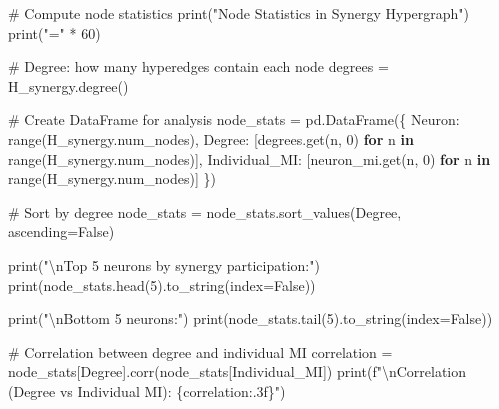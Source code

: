 \documentclass[
  11pt,
  letterpaper,
  oneside,
  openany]{book}
\newenvironment{Shaded}{\begin{snugshade}}{\end{snugshade}}
\newcommand{\BuiltInTok}[1]{\textcolor[rgb]{0.00,0.23,0.31}{#1}}
\newcommand{\CharTok}[1]{\textcolor[rgb]{0.13,0.47,0.30}{#1}}
\newcommand{\CommentTok}[1]{\textcolor[rgb]{0.37,0.37,0.37}{#1}}
\newcommand{\ControlFlowTok}[1]{\textcolor[rgb]{0.00,0.23,0.31}{\textbf{#1}}}
\newcommand{\DecValTok}[1]{\textcolor[rgb]{0.68,0.00,0.00}{#1}}
\newcommand{\KeywordTok}[1]{\textcolor[rgb]{0.00,0.23,0.31}{\textbf{#1}}}
\newcommand{\NormalTok}[1]{\textcolor[rgb]{0.00,0.23,0.31}{#1}}
\newcommand{\OperatorTok}[1]{\textcolor[rgb]{0.37,0.37,0.37}{#1}}
\newcommand{\SpecialCharTok}[1]{\textcolor[rgb]{0.37,0.37,0.37}{#1}}
\newcommand{\SpecialStringTok}[1]{\textcolor[rgb]{0.13,0.47,0.30}{#1}}
\newcommand{\StringTok}[1]{\textcolor[rgb]{0.13,0.47,0.30}{#1}}
\newcommand{\VariableTok}[1]{\textcolor[rgb]{0.07,0.07,0.07}{#1}}
\begin{document}
\begin{Shaded}
\begin{Highlighting}[]
\CommentTok{\# Compute node statistics}
\BuiltInTok{print}\NormalTok{(}\StringTok{"Node Statistics in Synergy Hypergraph"}\NormalTok{)}
\BuiltInTok{print}\NormalTok{(}\StringTok{"="} \OperatorTok{*} \DecValTok{60}\NormalTok{)}

\CommentTok{\# Degree: how many hyperedges contain each node}
\NormalTok{degrees }\OperatorTok{=}\NormalTok{ H\_synergy.degree()}

\CommentTok{\# Create DataFrame for analysis}
\NormalTok{node\_stats }\OperatorTok{=}\NormalTok{ pd.DataFrame(\{}
    \StringTok{\textquotesingle{}Neuron\textquotesingle{}}\NormalTok{: }\BuiltInTok{range}\NormalTok{(H\_synergy.num\_nodes),}
    \StringTok{\textquotesingle{}Degree\textquotesingle{}}\NormalTok{: [degrees.get(n, }\DecValTok{0}\NormalTok{) }\ControlFlowTok{for}\NormalTok{ n }\KeywordTok{in} \BuiltInTok{range}\NormalTok{(H\_synergy.num\_nodes)],}
    \StringTok{\textquotesingle{}Individual\_MI\textquotesingle{}}\NormalTok{: [neuron\_mi.get(n, }\DecValTok{0}\NormalTok{) }\ControlFlowTok{for}\NormalTok{ n }\KeywordTok{in} \BuiltInTok{range}\NormalTok{(H\_synergy.num\_nodes)]}
\NormalTok{\})}

\CommentTok{\# Sort by degree}
\NormalTok{node\_stats }\OperatorTok{=}\NormalTok{ node\_stats.sort\_values(}\StringTok{\textquotesingle{}Degree\textquotesingle{}}\NormalTok{, ascending}\OperatorTok{=}\VariableTok{False}\NormalTok{)}

\BuiltInTok{print}\NormalTok{(}\StringTok{"}\CharTok{\textbackslash{}n}\StringTok{Top 5 neurons by synergy participation:"}\NormalTok{)}
\BuiltInTok{print}\NormalTok{(node\_stats.head(}\DecValTok{5}\NormalTok{).to\_string(index}\OperatorTok{=}\VariableTok{False}\NormalTok{))}

\BuiltInTok{print}\NormalTok{(}\StringTok{"}\CharTok{\textbackslash{}n}\StringTok{Bottom 5 neurons:"}\NormalTok{)}
\BuiltInTok{print}\NormalTok{(node\_stats.tail(}\DecValTok{5}\NormalTok{).to\_string(index}\OperatorTok{=}\VariableTok{False}\NormalTok{))}

\CommentTok{\# Correlation between degree and individual MI}
\NormalTok{correlation }\OperatorTok{=}\NormalTok{ node\_stats[}\StringTok{\textquotesingle{}Degree\textquotesingle{}}\NormalTok{].corr(node\_stats[}\StringTok{\textquotesingle{}Individual\_MI\textquotesingle{}}\NormalTok{])}
\BuiltInTok{print}\NormalTok{(}\SpecialStringTok{f"}\CharTok{\textbackslash{}n}\SpecialStringTok{Correlation (Degree vs Individual MI): }\SpecialCharTok{\{}\NormalTok{correlation}\SpecialCharTok{:.3f\}}\SpecialStringTok{"}\NormalTok{)}


\end{Highlighting}
\end{Shaded}
\end{document}
